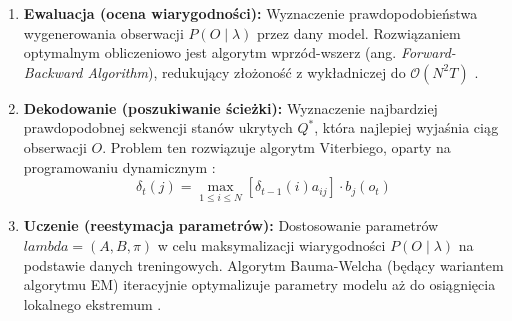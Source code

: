 \begin{enumerate}
\item \textbf{Ewaluacja (ocena wiarygodności):} Wyznaczenie prawdopodobieństwa wygenerowania obserwacji $P(O \mid \lambda)$ przez dany model. Rozwiązaniem optymalnym obliczeniowo jest
algorytm wprzód-wszerz (ang. \textit{Forward-Backward Algorithm}), redukujący złożoność z wykładniczej do $\mathcal{O}(N^2 T)$ \cite[s.~261--262]{rabiner1989tutorial}.
\item \textbf{Dekodowanie (poszukiwanie ścieżki):} Wyznaczenie najbardziej prawdopodobnej sekwencji stanów ukrytych $Q^*$, która najlepiej wyjaśnia ciąg obserwacji $O$. Problem ten rozwiązuje algorytm Viterbiego, oparty na programowaniu dynamicznym \cite[s.~261, 264]{rabiner1989tutorial}:
\begin{equation}
\delta_t(j) = \max_{1 \le i \le N} \left[ \delta_{t-1}(i) a_{ij} \right] \cdot b_j(o_t)
\end{equation}
\item \textbf{Uczenie (reestymacja parametrów):} Dostosowanie parametrów $lambda = (A, B, \pi)$ w celu maksymalizacji wiarygodności $P(O \mid \lambda)$ na podstawie danych treningowych. Algorytm Bauma-Welcha (będący wariantem algorytmu EM) iteracyjnie optymalizuje parametry modelu aż do osiągnięcia lokalnego ekstremum \cite[s.~261, 264--265]{rabiner1989tutorial}.
\end{enumerate}
